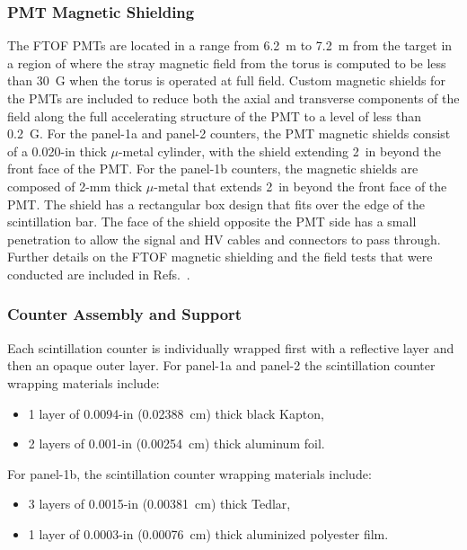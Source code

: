 \documentclass{elsart}
\begin{document}
\subsubsection{PMT Magnetic Shielding}

The FTOF PMTs are located in a range from 6.2~m to 7.2~m from the target in a region of where the
stray magnetic field from the torus is computed to be less than 30~G when the torus is operated at full
field. Custom magnetic shields for the PMTs are included to reduce both the axial and transverse
components of the field along the full accelerating structure of the PMT to a level of less than 0.2~G.
For the panel-1a and panel-2 counters, the PMT magnetic shields consist of a 0.020-in thick $\mu$-metal
cylinder, with the shield extending 2~in beyond the front face of the PMT.  For the panel-1b counters, the
magnetic shields are composed of 2-mm thick $\mu$-metal that extends 2~in beyond the front face of
the PMT. The shield has a rectangular box design that fits over the edge of the scintillation bar. The face
of the shield opposite the PMT side has a small penetration to allow the signal and HV cables and connectors
to pass through. Further details on the FTOF magnetic shielding and the field tests that were conducted
are included in Refs.~\cite{nim-p1b,ftof-shields}.

\subsubsection{Counter Assembly and Support}

Each scintillation counter is individually wrapped first with a reflective layer and then an opaque outer layer.
For panel-1a and panel-2 the scintillation counter wrapping materials include:

\begin{itemize}
\item 1 layer of 0.0094-in (0.02388~cm) thick black Kapton,
\item 2 layers of 0.001-in (0.00254~cm) thick aluminum foil.
\end{itemize}

\noindent
For panel-1b, the scintillation counter wrapping materials include:

\begin{itemize}
\item 3 layers of 0.0015-in (0.00381~cm) thick Tedlar,
\item 1 layer of 0.0003-in (0.00076~cm) thick aluminized polyester film.
\end{itemize}
\end{document}
